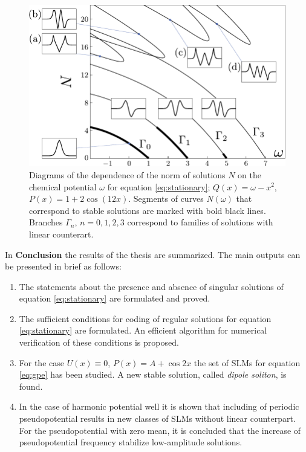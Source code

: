 \documentclass[candidate, href, colorlinks]{disser}
\begin{document}
\begin{figure}[h]
\centering
	\includegraphics[scale = 1]{pic/branches}
	\caption{
		Diagrams of the dependence of the norm of solutions $N$ on the chemical potential $\omega$ for equation \eqref{eq:stationary}; $Q(x) = \omega - x^2$, $P(x) = 1 + 2 \cos (12 x)$.
		Segments of curves $N(\omega)$ that correspond to stable solutions are marked with bold black lines.
		Branches $\Gamma_n$, $n = 0, 1, 2, 3$ correspond to families of solutions with linear counterart.
	}
\label{fig:branches}
\end{figure}


In \textbf{Conclusion} the results of the thesis are summarized.
The main outputs can be presented in brief as follows: 
\begin{enumerate}
	\item The statements about the presence and absence of singular solutions of equation \eqref{eq:stationary} are formulated and proved.
	\item The sufficient conditions for coding of regular solutions for equation \eqref{eq:stationary} are formulated.
	An efficient algorithm for numerical verification of these conditions is proposed.
	\item For the case $U(x) \equiv 0$, $P(x) = A + \cos 2x$ the set of SLMs for equation \eqref{eq:gpe} has been studied.
	A new stable solution, called {\it dipole soliton}, is found.
	\item In the case of harmonic potential well it is shown that including of periodic pseudopotential results in new classes of SLMs without linear counterpart.
		For the pseudopotential with zero mean, it is concluded that the increase of pseudopotential frequency stabilize low-amplitude solutions.
\end{enumerate}
\end{document}
